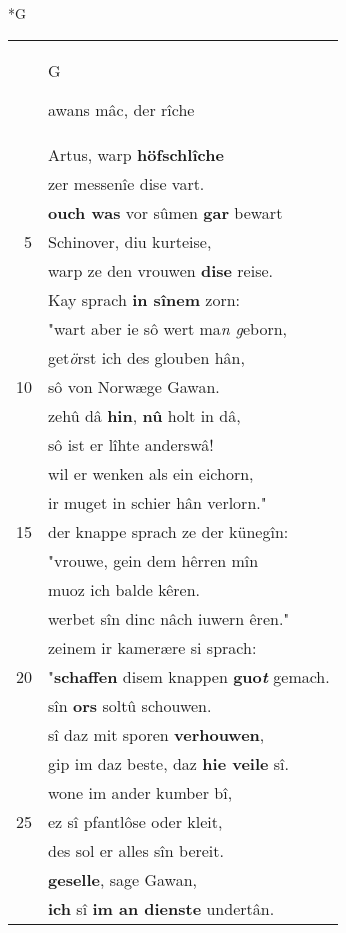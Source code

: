 \documentclass[8pt,a4paper,notitlepage]{article}
\begin{document}
\begin{table}[ht]
\begin{minipage}[t]{0.5\linewidth}
\small
\begin{center}*G
\end{center}
\begin{tabular}{rl}
 & \begin{large}G\end{large}awans mâc, der rîche\\ 
 & Artus, warp \textbf{höfschlîche}\\ 
 & zer messenîe dise vart.\\ 
 & \textbf{ouch was} vor sûmen \textbf{gar} bewart\\ 
5 & Schinover, diu kurteise,\\ 
 & warp ze den vrouwen \textbf{dise} reise.\\ 
 & Kay sprach \textbf{in sînem} zorn:\\ 
 & "wart aber ie sô wert ma\textit{n g}eborn,\\ 
 & get\textit{ö}rst ich des glouben hân,\\ 
10 & sô von Norwæge Gawan.\\ 
 & zehû dâ \textbf{hin}, \textbf{nû} holt in dâ,\\ 
 & sô ist er lîhte anderswâ!\\ 
 & wil er wenken als ein eichorn,\\ 
 & ir muget in schier hân verlorn."\\ 
15 & der knappe sprach ze der künegîn:\\ 
 & "vrouwe, gein dem hêrren mîn\\ 
 & muoz ich balde kêren.\\ 
 & werbet sîn dinc nâch iuwern êren."\\ 
 & zeinem ir kamerære si sprach:\\ 
20 & "\textbf{schaffen} disem knappen \textbf{guo\textit{t}} gemach.\\ 
 & sîn \textbf{ors} soltû schouwen.\\ 
 & sî daz mit sporen \textbf{verhouwen},\\ 
 & gip im daz beste, daz \textbf{hie veile} sî.\\ 
 & wone im ander kumber bî,\\ 
25 & ez sî pfantlôse oder kleit,\\ 
 & des sol er alles sîn bereit.\\ 
 & \textbf{geselle}, sage Gawan,\\ 
 & \textbf{ich} sî \textbf{im an dienste} undertân.\\ 

\end{tabular}
\end{minipage}
\end{table}
\end{document}
